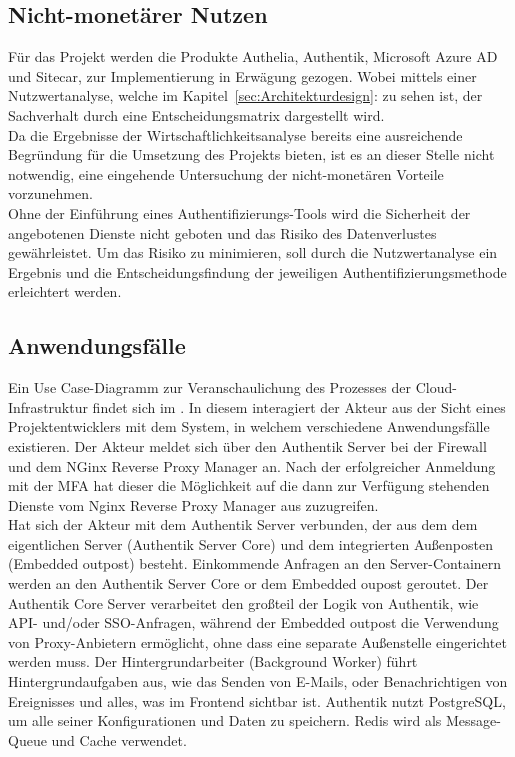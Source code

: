 \subsection{Nicht-monetärer Nutzen}
\label{sec:Nicht-monetärer Nutzen}
Für das Projekt werden die Produkte Authelia, Authentik, Microsoft Azure AD und Sitecar, zur Implementierung in Erwägung gezogen. 
Wobei mittels einer Nutzwertanalyse, welche im Kapitel~\ref{sec:Architekturdesign}:  zu sehen ist, der 
Sachverhalt durch eine Entscheidungsmatrix dargestellt wird.
\\Da die Ergebnisse der Wirtschaftlichkeitsanalyse bereits eine ausreichende Begründung für die Umsetzung des Projekts bieten, 
ist es an dieser Stelle nicht notwendig, eine eingehende Untersuchung der nicht-monetären Vorteile vorzunehmen.
\\Ohne der Einführung eines Authentifizierungs-Tools wird die Sicherheit der angebotenen Dienste nicht geboten und das Risiko des 
Datenverlustes gewährleistet. Um das Risiko zu minimieren, soll durch die Nutzwertanalyse ein Ergebnis und die Entscheidungsfindung 
der jeweiligen Authentifizierungsmethode erleichtert werden.


\subsection{Anwendungsfälle}
\label{sec:Anwendungsfaelle}
Ein Use Case-Diagramm zur Veranschaulichung des Prozesses der Cloud-Infrastruktur findet sich im .
In diesem interagiert der Akteur aus der Sicht eines Projektentwicklers mit dem System, in welchem verschiedene 
Anwendungsfälle existieren. Der Akteur meldet sich über den Authentik Server bei der Firewall und dem NGinx Reverse Proxy Manager an. 
Nach der erfolgreicher Anmeldung mit der \acs*{MFA} hat dieser die Möglichkeit auf die dann zur Verfügung stehenden Dienste vom 
Nginx Reverse Proxy Manager aus zuzugreifen.
\\Hat sich der Akteur mit dem Authentik Server verbunden, der aus dem dem eigentlichen Server (Authentik Server Core) und dem 
integrierten Außenposten (Embedded outpost) besteht. Einkommende Anfragen an den Server-Containern werden an den Authentik Server Core 
or dem Embedded oupost geroutet. Der Authentik Core Server verarbeitet den großteil der Logik von Authentik, wie \zB API- und/oder 
\acs*{SSO}-Anfragen, während der Embedded outpost die Verwendung von Proxy-Anbietern ermöglicht, ohne dass eine separate Außenstelle 
eingerichtet werden muss. Der Hintergrundarbeiter (Background Worker) führt Hintergrundaufgaben aus, wie das Senden von E-Mails, 
oder Benachrichtigen von Ereignisses und alles, was im Frontend sichtbar ist. Authentik nutzt PostgreSQL, um alle seiner 
Konfigurationen und Daten zu speichern. Redis wird als Message-Queue und Cache verwendet.